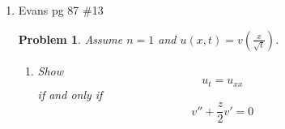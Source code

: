 \documentclass[a4paper]{article}
\newtheorem*{claim}{Claim}
\newtheorem*{problem}{Problem}
\begin{document}
\begin{enumerate}
\begin{claim}
    \end{claim}

    \begin{proof}
      \begin{enumerate}
        \item
          A simple calculation shows
          \begin{align*}
            \partial_t u_\lambda + \Delta u_\lambda &= \lambda^2 u_t + \lambda^2 \Delta u \\
            &= \lambda^2 (u_t + \Delta u) \\
            &= 0
          \end{align*}

        \item
          By part (a), we know $u_\lambda(x,t) = u(\lambda x, \lambda^2 t)$ satisfies the heat equation.
          Write
          \[ u_\lambda(x, t) = u( \lambda x_1, \dots, \lambda x_n, \lambda^2 t) .\]
          Taking the derivative with respect to $\lambda$ gives
          \begin{align*}
            \partial_\lambda u_\lambda &= x_1 \partial_{x_1} u + \dots + \partial_{x_n} u + 2 \lambda t \partial_t u \\
            &= x \cdot Du + 2 \lambda t u_t
          \end{align*}
          By choosing $\lambda = 1$, we get $v$.
          By assumption, $u$ is smooth, so our partial derivatives commute. Therefore,
          \begin{align*}
            v_t - \Delta v &= \partial_t ( \partial_\lambda u_\lambda |_{\lambda=1} ) - \Delta ( \partial_\lambda u_\lambda |_{\lambda=1} ) \\
            &= \partial_\lambda (\partial_t u_\lambda ) |_{\lambda=1} + \partial_\lambda (\Delta u_\lambda) |_{\lambda=1} \\
            &= \partial_\lambda (\partial_t u_\lambda + \Delta u_\lambda ) |_{\lambda=1} \\
            &= 0
          \end{align*}
          because $u_\lambda$ solves the heat equation. Thus, $v$ solves the heat equation as well.
      \end{enumerate}
    \end{proof}

  \item Evans pg 87 \#13
    \begin{problem}
      Assume $n = 1$ and $u(x,t) = v\left( \frac{x}{\sqrt{t}} \right)$.
      \begin{enumerate}
        \item Show
          \[ u_t = u_{xx} \]
          if and only if
          \begin{equation} \label{eq:ODE}
            v'' + \frac{z}{2} v' = 0
          \end{equation}


\end{enumerate}
\end{problem}
\end{enumerate}
\end{document}
